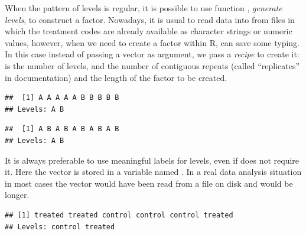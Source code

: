 \documentclass[krantz2]{krantz}\usepackage{knitr}
\begin{document}
\begin{explainbox}
When the pattern of levels is regular, it is possible to use function , \emph{generate levels}, to construct a factor. Nowadays, it is usual to read data into \Rlang from files in which the treatment codes are already available as character strings or numeric values, however, when we need to create a factor within R,  can save some typing. In this case instead of passing a vector as argument, we pass a \emph{recipe} to create it:  is the number of levels, and  the number of contiguous repeats (called ``replicates'' in \Rlang documentation) and  the length of the factor to be created.

\begin{knitrout}\footnotesize
{}\color{fgcolor}\begin{kframe}
\begin{alltt}
\hlstd{(} \hlstd{=} \hlstd{,}  \hlstd{=} \hlstd{,}  \hlstd{=} \hlstd{(}\hlstd{,} \hlstd{))}
\end{alltt}
\begin{verbatim}
##  [1] A A A A A B B B B B
## Levels: A B
\end{verbatim}
\begin{alltt}
\hlstd{(} \hlstd{=} \hlstd{,}  \hlstd{=} \hlstd{,}  \hlstd{=} \hlstd{,}  \hlstd{=} \hlstd{(}\hlstd{,} \hlstd{))}
\end{alltt}
\begin{verbatim}
##  [1] A B A B A B A B A B
## Levels: A B
\end{verbatim}
\end{kframe}
\end{knitrout}
\end{explainbox}

It is always preferable to use meaningful labels for levels, even if \Rlang does not require it. Here the vector is stored in a variable named . In a real data analysis situation in most cases the vector would have been read from a file on disk and would be longer.

\begin{knitrout}\footnotesize
{}\color{fgcolor}\begin{kframe}
\begin{alltt}
 \hlkwb{<-} \hlstd{(}\hlstd{,} \hlstd{,} \hlstd{,} \hlstd{,} \hlstd{,} \hlstd{)}
\end{alltt}
\begin{verbatim}
## [1] treated treated control control control treated
## Levels: control treated
\end{verbatim}
\end{kframe}
\end{knitrout}
\end{document}
